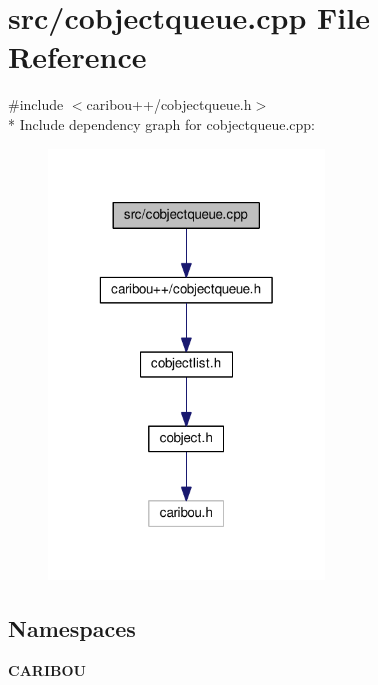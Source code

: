 \section{src/cobjectqueue.cpp File Reference}
\label{cobjectqueue_8cpp}
{\ttfamily \#include $<$caribou++/cobjectqueue.\-h$>$}\\*
Include dependency graph for cobjectqueue.\-cpp\-:\nopagebreak
\begin{figure}[H]
\begin{center}
\leavevmode
\includegraphics[width=208pt]{cobjectqueue_8cpp__incl}
\end{center}
\end{figure}
\subsection*{Namespaces}
\begin{DoxyCompactItemize}
\item 
{\bf C\-A\-R\-I\-B\-O\-U}
\end{DoxyCompactItemize}
